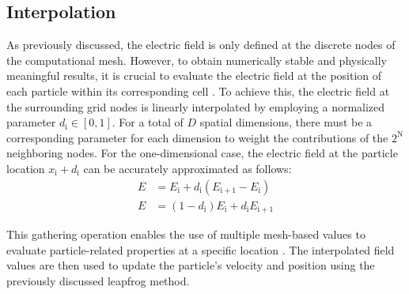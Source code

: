 \subsection{Interpolation}
As previously discussed, the electric field is only defined at the discrete nodes of the computational mesh. However, to obtain numerically stable and physically meaningful results, it is crucial to evaluate the electric field at the position of each particle within its corresponding cell \cite{brieda_plasma_2019}. To achieve this, the electric field at the surrounding grid nodes is linearly interpolated by employing a normalized parameter $d_\mathrm{i} \in [0, 1]$. For a total of $D$ spatial dimensions, there must be a corresponding parameter for each dimension to weight the contributions of the $2^\mathrm{N}$ neighboring nodes. For the one-dimensional case, the electric field at the particle location $x_\mathrm{i}+d_\mathrm{i}$ can be accurately approximated as follows:
\begin{align}
    E &= E_\mathrm{i} + d_\mathrm{i}\left(E_\mathrm{i+1} - E_\mathrm{i}\right)\\
    E &=  \left( 1-d_\mathrm{i}\right)E_\mathrm{i} + d_\mathrm{i}E_\mathrm{i+1}
\end{align}

This gathering operation enables the use of multiple mesh-based values to evaluate particle-related properties at a specific location \cite{brieda_plasma_2019}. The interpolated field values are then used to update the particle's velocity and position using the previously discussed leapfrog method.

